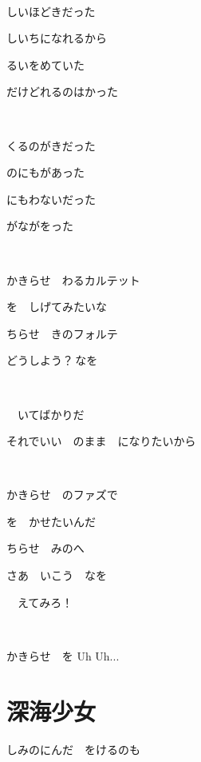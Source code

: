 \documentclass[12pt,a4paper]{article}
\begin{document}
~

しいほどきだった

しいちになれるから

るいをめていた

だけどれるのはかった

~

くるのがきだった

のにもがあった

にもわないだった

がながをった

~

かきらせ　わるカルテット

を　しげてみたいな

ちらせ　きのフォルテ

どうしよう？\,なを

~

　いてばかりだ

それでいい　のまま　になりたいから

~

かきらせ　のファズで

を　かせたいんだ

ちらせ　みのへ

さあ　いこう　なを

　えてみろ！

~

かきらせ　を Uh Uh...


\section{深海少女}

しみのにんだ　をけるのも
\end{document}
